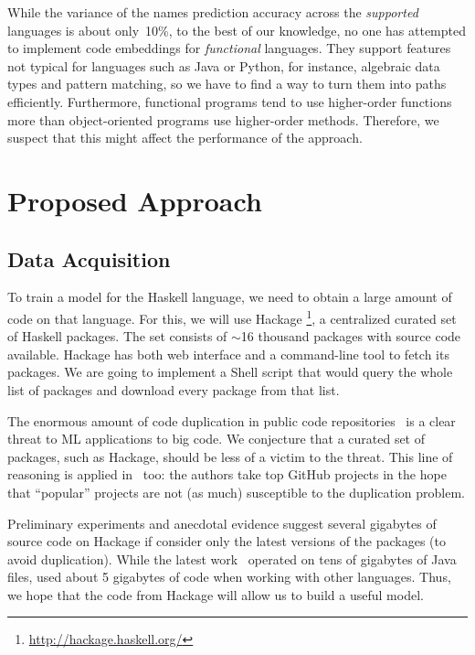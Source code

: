 \documentclass[12pt]{article}
\begin{document}
While the variance of the names prediction accuracy across the \emph{supported} languages 
is about only~10\%, to the best of our knowledge, 
no one has attempted to implement code embeddings for \emph{functional} languages.
They support features not typical for languages such as Java or Python,
for instance, algebraic data types and pattern matching,
so we have to find a way to turn them into paths efficiently.
Furthermore, functional programs tend to use higher-order functions more
than object-oriented programs use higher-order methods.
Therefore, we suspect that this might affect the performance of the \cv approach.

\section{Proposed Approach}

\subsection{Data Acquisition}

To train a \cv model for the Haskell language, we need to obtain a large amount of code on that language.
For this, we will use
Hackage%
\footnote{\url{http://hackage.haskell.org/}},
a centralized curated set of Haskell packages.
The set consists of $\sim$16 thousand packages with source code available. Hackage has 
both web interface and a command-line tool to fetch its packages. We are going to implement
a Shell script that would query the whole list of packages and download every package from that list.

The enormous amount of code duplication in public code repositories~\cite{Lopes2017} is a clear threat 
to ML applications to big code. We conjecture that a curated set of packages, such as Hackage, should 
be less of a victim to the threat. This line of reasoning is applied in~\cite{code2vec} too: the authors
take top GitHub projects in the hope that ``popular'' projects are not (as much) susceptible to the 
duplication problem.

Preliminary experiments and anecdotal evidence suggest several gigabytes of source code on Hackage
if consider only the latest versions of the packages (to avoid duplication). 
While the latest \cv work~\cite{code2vec} 
operated on tens of gigabytes of Java files, \citet{Allamanis2018} used about 5 gigabytes of code when
working with other languages. Thus, we hope that the code from Hackage will allow us to build a useful model.
\end{document}
